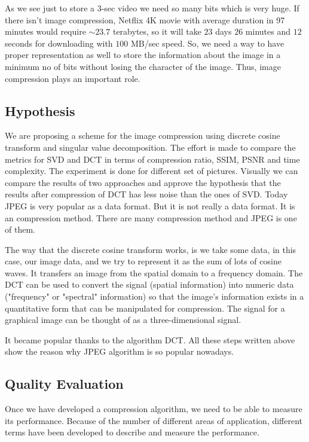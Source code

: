 As we see just to store a 3-sec video we need so many bits which is very huge. If there isn't image compression, Netflix 4K movie with average duration in 97 minutes would require $\sim 23.7$ terabytes, so it will take $23$ days $26$ minutes and $12$ seconds for downloading with $100$ MB/sec speed.
So, we need a way to have proper representation as well to store the information about the image in a minimum no of bits without losing the character of the image. Thus, image compression plays an important role. 

\subsection{Hypothesis}

We are proposing a scheme for the image compression using discrete cosine transform and singular value decomposition.
The effort is made to compare the metrics for SVD and DCT in terms of compression ratio, SSIM, PSNR and time complexity.
The experiment is done for different set of pictures. 
Visually we can compare the results of two approaches and approve the hypothesis that the results after compression of DCT has less noise than the ones of SVD.
Today JPEG is very popular as a data format. But it is not really a data format. It is an compression method. There are many compression method and JPEG is one of them. 

The way that the discrete cosine transform works, is we take some data, in this case, our image data, and we try to represent it as the sum of lots of cosine waves. It transfers an image from the spatial domain to a frequency domain.
The DCT can be used to convert the signal (spatial information) into numeric data ("frequency" or "spectral" information) so that the image's information exists in a quantitative form that can be manipulated for compression.    
The signal for a graphical image can be thought of as a three-dimensional signal.

It became popular thanks to the algorithm DCT. All these steps written above show the reason why JPEG algorithm is so popular nowadays.

\subsection{Quality Evaluation}

Once we have developed a compression algorithm, we need to be able to measure its performance. Because of the number of different areas of application, different terms have been developed to describe and measure the performance. 

